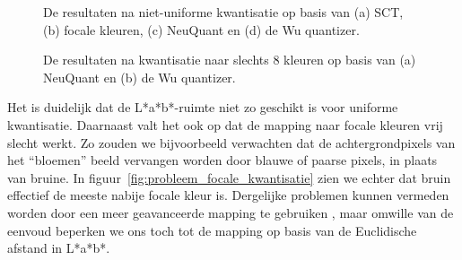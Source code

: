 \begin{figure}[bp]
\vspace{10pt}
\centering
{}
\caption{\label{fig:kwantistatie_niet-uniform}De resultaten na niet-uniforme kwantisatie 
op basis van (a) SCT, (b) focale kleuren, (c) NeuQuant en (d) de Wu quantizer.}
\end{figure}

\begin{figure}[bp]
\vspace{10pt}
\centering
{}
\caption{\label{fig:kwantistatie_klein_aantal_kleuren}De resultaten na kwantisatie naar 
slechts 8 kleuren op basis van (a) NeuQuant en (b) de Wu quantizer.}
\end{figure}

Het is duidelijk dat de L*a*b*-ruimte niet zo geschikt is voor uniforme kwantisatie. 
Daarnaast valt het ook op
dat de mapping naar focale kleuren vrij slecht werkt. Zo zouden we bijvoorbeeld verwachten
dat de achtergrondpixels van het ``bloemen'' beeld vervangen worden door blauwe of
paarse pixels, in plaats van bruine. In figuur~\ref{fig:probleem_focale_kwantisatie} zien
we echter dat bruin effectief de meeste nabije focale kleur is. Dergelijke problemen
kunnen vermeden worden door een meer geavanceerde mapping te gebruiken 
\cite{van_den_broek:human_color_categorization_for_cbir}, maar omwille van de eenvoud 
beperken we ons toch tot de mapping op basis van de Euclidische afstand in L*a*b*.

